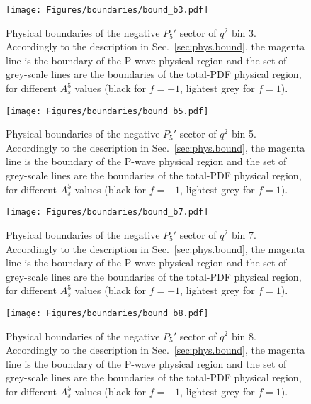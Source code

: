 \begin{figure}[!hbt]
  \centering
  \texttt{[image: Figures/boundaries/bound\_b3.pdf]}
  \caption{Physical boundaries of the negative $P_5'$ sector of $q^2$ bin 3. Accordingly to the description in Sec.~\ref{sec:phys.bound}, the magenta line is the boundary of the P-wave physical region and the set of grey-scale lines are the boundaries of the total-PDF physical region, for different $A_s^5$ values (black for $f=-1$, lightest grey for $f=1$).}
  \label{fig:bound3}
\end{figure}

\begin{figure}[!hbt]
  \centering
  \texttt{[image: Figures/boundaries/bound\_b5.pdf]}
  \caption{Physical boundaries of the negative $P_5'$ sector of $q^2$ bin 5. Accordingly to the description in Sec.~\ref{sec:phys.bound}, the magenta line is the boundary of the P-wave physical region and the set of grey-scale lines are the boundaries of the total-PDF physical region, for different $A_s^5$ values (black for $f=-1$, lightest grey for $f=1$).}
  \label{fig:bound5}
\end{figure}

\begin{figure}[!hbt]
  \centering
  \texttt{[image: Figures/boundaries/bound\_b7.pdf]}
  \caption{Physical boundaries of the negative $P_5'$ sector of $q^2$ bin 7. Accordingly to the description in Sec.~\ref{sec:phys.bound}, the magenta line is the boundary of the P-wave physical region and the set of grey-scale lines are the boundaries of the total-PDF physical region, for different $A_s^5$ values (black for $f=-1$, lightest grey for $f=1$).}
  \label{fig:bound7}
\end{figure}

\begin{figure}[!hbt]
  \centering
  \texttt{[image: Figures/boundaries/bound\_b8.pdf]}
  \caption{Physical boundaries of the negative $P_5'$ sector of $q^2$ bin 8. Accordingly to the description in Sec.~\ref{sec:phys.bound}, the magenta line is the boundary of the P-wave physical region and the set of grey-scale lines are the boundaries of the total-PDF physical region, for different $A_s^5$ values (black for $f=-1$, lightest grey for $f=1$).}
  \label{fig:bound8}
\end{figure}
